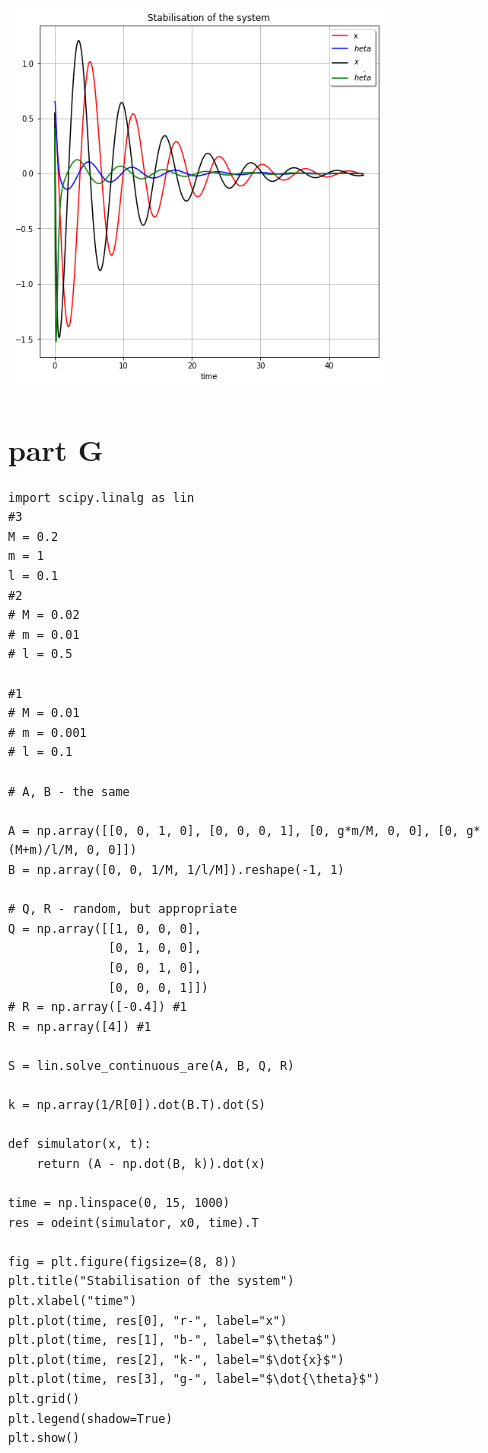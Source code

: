 \documentclass[a4paper,11pt]{article}
\makeatletter
\newcommand{\problemquestion}[1]{\gdef\@problemquestion{#1}}%
\newcommand{\problemsolution}[1]{\gdef\@problemsolution{#1}}%
\theoremstyle{mytheor}
\makeatother
\begin{document}
\includegraphics[width=10cm, height=10cm]{F.png}




\section*{part G}
\begin{problem}
  \problemquestion{(for the controllable system) design linear quadratic regulator for linearized system. Assess the performance of the controller for variety of initial conditions. Justify the choice of initial conditions;
  \problemsolution{Initial conditions were chosen such that system will behave differently}
}
\end{problem}

\begin{lstlisting}[label={list:second}]
import scipy.linalg as lin
#3
M = 0.2
m = 1
l = 0.1
#2
# M = 0.02
# m = 0.01
# l = 0.5

#1
# M = 0.01
# m = 0.001
# l = 0.1

# A, B - the same

A = np.array([[0, 0, 1, 0], [0, 0, 0, 1], [0, g*m/M, 0, 0], [0, g*(M+m)/l/M, 0, 0]])
B = np.array([0, 0, 1/M, 1/l/M]).reshape(-1, 1)

# Q, R - random, but appropriate
Q = np.array([[1, 0, 0, 0], 
              [0, 1, 0, 0], 
              [0, 0, 1, 0], 
              [0, 0, 0, 1]])
# R = np.array([-0.4]) #1
R = np.array([4]) #1

S = lin.solve_continuous_are(A, B, Q, R)

k = np.array(1/R[0]).dot(B.T).dot(S)

def simulator(x, t):
    return (A - np.dot(B, k)).dot(x)

time = np.linspace(0, 15, 1000)  
res = odeint(simulator, x0, time).T

fig = plt.figure(figsize=(8, 8))
plt.title("Stabilisation of the system")
plt.xlabel("time")
plt.plot(time, res[0], "r-", label="x")
plt.plot(time, res[1], "b-", label="$\theta$")
plt.plot(time, res[2], "k-", label="$\dot{x}$")
plt.plot(time, res[3], "g-", label="$\dot{\theta}$")
plt.grid()
plt.legend(shadow=True)
plt.show()

\end{lstlisting}
\end{document}
